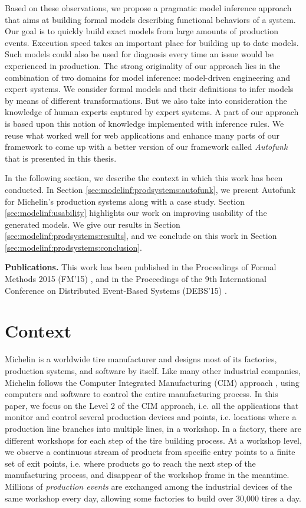 Based on these observations, we propose a pragmatic model
inference approach that aims at building formal models describing
functional behaviors of a system. Our goal is to quickly build
exact models from large amounts of production events. Execution
speed takes an important place for building up to date models.
Such models could also be used for diagnosis every time an issue
would be experienced in production. The strong originality of our
approach lies in the combination of two domains for model
inference: model-driven engineering and expert systems. We
consider formal models and their definitions to infer models by
means of different transformations. But we also take into
consideration the knowledge of human experts captured by expert
systems. A part of our approach is based upon this notion of
knowledge implemented with inference rules. We reuse what worked
well for web applications and enhance many parts of our framework
to come up with a better version of our framework called
\textit{Autofunk} that is presented in this thesis.

In the following section, we describe the context in which this
work has been conducted. In Section
\ref{sec:modelinf:prodsystems:autofunk}, we present Autofunk for
Michelin's production systems along with a case study. Section
\ref{sec:modelinf:usability} highlights our work on improving
usability of the generated models.  We give our results in
Section \ref{sec:modelinf:prodsystems:results}, and we conclude
on this work in Section \ref{sec:modelinf:prodsystems:conclusion}.

\textbf{Publications.} This work has been published in the
Proceedings of Formal Methods 2015 (FM'15)
\cite{DBLP:conf/fm/DurandS15}, and in the Proceedings of the 9th
International Conference on Distributed Event-Based Systems
(DEBS'15) \cite{DBLP:conf/debs/SalvaD15}.

\section{Context}

Michelin is a worldwide tire manufacturer and designs most of its
factories, production systems, and software by itself.  Like
many other industrial companies, Michelin follows the Computer
Integrated Manufacturing (CIM) approach \cite{rehg2004computer},
using computers and software to control the entire manufacturing
process. In this paper, we focus on the Level 2 of the CIM
approach, i.e. all the applications that monitor and control
several production devices and points, i.e. locations where a
production line branches into multiple lines, in a workshop. In a
factory, there are different workshops for each step of the tire
building process. At a workshop level, we observe a continuous
stream of products from specific entry points to a finite set of
exit points, i.e. where products go to reach the next step of the
manufacturing process, and disappear of the workshop frame in the
meantime. Millions of \emph{production events} are exchanged
among the industrial devices of the same workshop every day,
allowing some factories to build over 30,000 tires a day.

